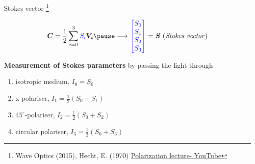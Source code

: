 \documentclass[12pt, dvipsnames]{beamer}
\numberwithin{equation}{section}
\newcommand\blfootnote[1]{%
	\begingroup
	\renewcommand\thefootnote{}\footnote{#1}%
	\addtocounter{footnote}{-1}%
	\endgroup
}
\begin{document}
\begin{frame}{Stokes vector}\blfootnote{Wave Optics (2015), Hecht, E. (1970) \href{https://www.youtube.com/watch?v=RowMxWt4mVE&list=LL&index=5}{Polarization lecture- YouTube}}
	$$\boldsymbol{C} = \frac{1}{2} \sum_{i=0}^{3} {\color{blue}S_i} \boldsymbol{V_i}\pause \longrightarrow {\color{blue}\begin{bmatrix} S_0\\ S_1\\ S_2\\S_3\end{bmatrix}} = \boldsymbol{S} \text{ (\textit{Stokes vector})}$$\pause


\textbf{Measurement of Stokes parameters} by passing the light through
\begin{enumerate}
	\item isotropic medium, $I_0 = S_0$
	\item x-polariser, $I_1 = \frac{1}{2} (S_0+S_1)$
	\item $45^\circ$-polariser, $I_2 = \frac{1}{2} (S_0+S_2)$
	\item circular polariser, $I_3 = \frac{1}{2} (S_0+S_3)$
\end{enumerate}

\end{frame}
\end{document}
